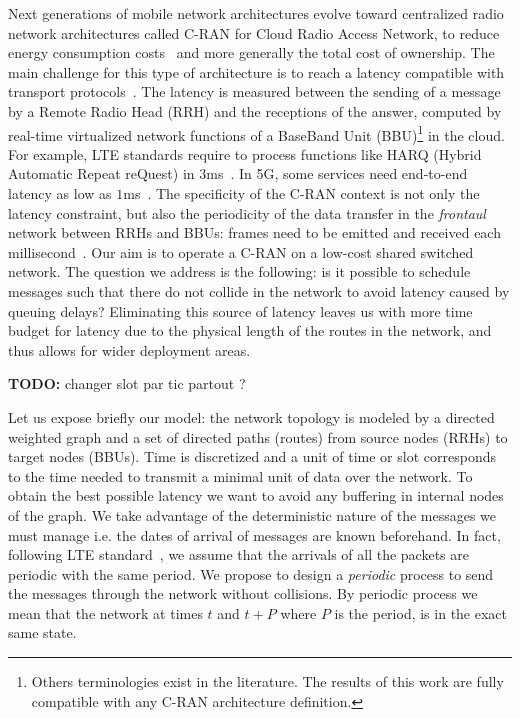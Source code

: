 \documentclass[10pt, conference, letterpaper]{IEEEtran}
\begin{document}
Next generations of mobile network architectures evolve toward centralized radio network architectures called C-RAN for Cloud Radio Access Network, to reduce energy consumption costs~\cite{mobile2011c} and more generally the total cost of ownership. The main challenge for this type of architecture is to reach a latency compatible with transport protocols~\cite{ieeep802}. The latency is measured between the sending of a message by a Remote Radio Head (RRH) and the receptions of the answer, computed by real-time virtualized network functions of a BaseBand Unit (BBU)\footnote{Others terminologies exist in the literature. The results of this work are fully compatible with any C-RAN architecture definition.} in the cloud. For example, LTE standards require to process functions like HARQ (Hybrid Automatic Repeat reQuest) in $3$ms~\cite{bouguen2012lte}. In 5G, some services need end-to-end latency as low as $1$ms~\cite{3gpp5g,boccardi2014five}. The specificity of the C-RAN context is not only the latency constraint, but also the periodicity of the data transfer in the \emph{frontaul} network between RRHs and BBUs: frames need to be emitted and received each millisecond~\cite{bouguen2012lte}.
Our aim is to operate a C-RAN on a low-cost shared switched network.
The question we address is the following: is it possible to schedule messages such that there do not collide in the network to avoid latency caused by queuing delays? 
Eliminating this source of latency leaves us with more time budget for latency due to the physical length of the routes in the network, and thus allows for wider deployment areas.

\textbf{TODO:} changer slot par tic partout ?

Let us expose briefly our model: the network topology is modeled by a directed weighted graph and a set of directed paths (routes) from source nodes (RRHs) to target nodes (BBUs). Time is discretized and a unit of time or slot corresponds to the time needed to transmit a minimal unit of data over the network. To obtain the best possible latency we want to avoid any buffering in internal nodes of the graph.  We take advantage of the deterministic nature of the messages we must manage i.e. the dates of arrival of messages are known beforehand. In fact, following LTE standard~\cite{bouguen2012lte}, we assume that the arrivals of all the packets are periodic with the same period. We propose to design a \emph{periodic} process to send the messages through the network without collisions. By periodic process we mean that the network at times $t$ and $t+P$ where $P$ is the period, is in the exact same state. 
\end{document}
